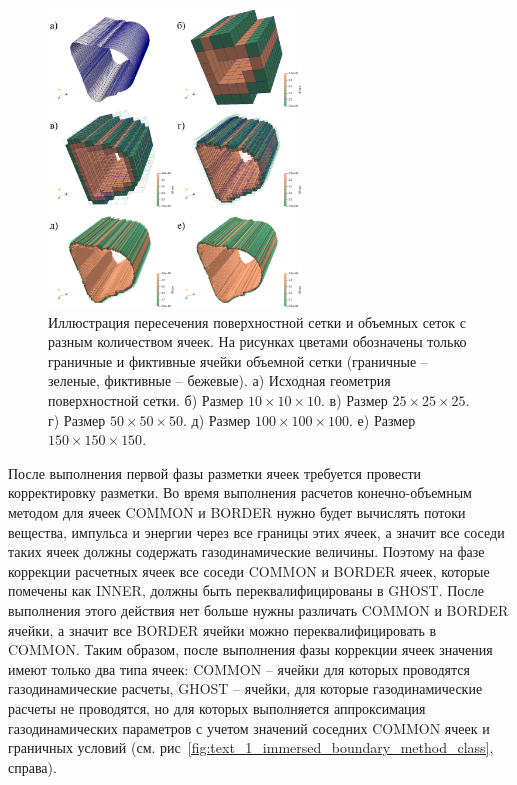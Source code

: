 \begin{figure}[ht]
\centering
\includegraphics[width=0.6\textwidth]{./pics/text_1_immersed_boundary_method/contour.png}
\singlespacing
{}\caption{Иллюстрация пересечения поверхностной сетки и объемных сеток с разным количеством ячеек. На рисунках цветами обозначены только граничные и фиктивные ячейки объемной сетки (граничные -- зеленые, фиктивные -- бежевые). а) Исходная геометрия поверхностной сетки. б) Размер $10 \times 10 \times 10$. в) Размер $25 \times 25 \times 25$. г) Размер $50 \times 50 \times 50$. д) Размер $100 \times 100 \times 100$. е) Размер $150 \times 150 \times 150$.}
\label{fig:text_1_mesh_intersect_contour}
\end{figure}

После выполнения первой фазы разметки ячеек требуется провести корректировку разметки.
Во время выполнения расчетов конечно-объемным методом для ячеек COMMON и BORDER нужно будет вычислять потоки вещества, импульса и энергии через все границы этих ячеек, а значит все соседи таких ячеек должны содержать газодинамические величины.
Поэтому на фазе коррекции расчетных ячеек все соседи COMMON и BORDER ячеек, которые помечены как INNER, должны быть переквалифицированы в GHOST.
После выполнения этого действия нет больше нужны различать COMMON и BORDER ячейки, а значит все BORDER ячейки можно переквалифицировать в COMMON.
Таким образом, после выполнения фазы коррекции ячеек значения имеют только два типа ячеек: COMMON -- ячейки для которых проводятся газодинамические расчеты, GHOST -- ячейки, для которые газодинамические расчеты не проводятся, но для которых выполняется аппроксимация газодинамических параметров с учетом значений соседних COMMON ячеек и граничных условий (см. рис~\ref{fig:text_1_immersed_boundary_method_class}, справа).

